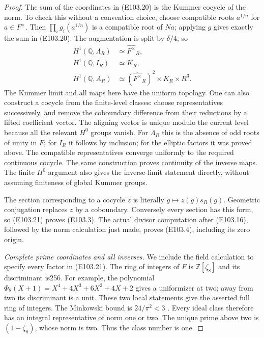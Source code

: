 \begin{proof}
The sum of the coordinates in (E103.20) is the Kummer
cocycle of the norm.  To check this without a convention
choice, choose compatible roots $a^{1/n}$ for $a\in F^\times$.
Then $\prod_i g_i(a^{1/n})$ is a compatible root of $Na$;
applying $g$ gives exactly the sum in (E103.20).
The augmentation is split by $\delta/4$, so
\[
 \begin{split}
 H^1(\mathbb Q,\Lambda_R)&\simeq\widehat{F^\times}_R,\\
 H^1(\mathbb Q,I_R)&\simeq K_R,\\
 H^1(\mathbb Q,A_R)&\simeq
       (\widehat{F^\times}_R)^2\times K_R\times R^3.
 \end{split}
 \tag{E103.21}
\]
The Kummer limit and all maps here have the uniform topology.
One can also construct a cocycle from the finite-level classes:
choose representatives successively, and remove the
coboundary difference from their reductions by a lifted
coefficient vector.  The aligning vector is unique modulo
the current level because all the relevant $H^0$ groups vanish.
For $\Lambda_R$ this is the absence of odd roots of unity in $F$;
for $I_R$ it follows by inclusion; for the elliptic factors it
was proved above.  The compatible representatives converge
uniformly to the required continuous cocycle.
The same construction proves continuity of the inverse maps.
The finite $H^0$ argument also gives the inverse-limit statement
directly, without assuming finiteness of global Kummer groups.

The section corresponding to a cocycle $z$ is literally
$g\mapsto z(g)s_R(g)$.  Geometric conjugation replaces $z$ by
a coboundary.  Conversely every section has this form, so
(E103.21) proves (E103.3).  The actual divisor computation after
(E103.16), followed by the norm calculation just made, proves
(E103.4), including its zero origin.

\emph{Complete prime coordinates and all inverses.}
We include the field calculation to specify every factor in
(E103.21).  The ring of integers of $F$ is $\mathbb Z[\zeta _8]$
and its discriminant is256.  For example, the polynomial
$\Phi _8(X+1)=X^4+4X^3+6X^2+4X+2$ gives a uniformizer at two;
away from two its discriminant is a unit.  These two local
statements give the asserted full ring of integers.
The Minkowski bound is $24/\pi^2<3$
\cite[Theorem4.3, printed p.70]{E103_MilneANT}.
Every ideal class therefore has an integral representative
of norm one or two.  The unique prime above two is
$(1-\zeta _8)$, whose norm is two.  Thus the class number is one.


\end{proof}
